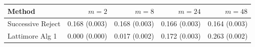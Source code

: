 \begin{tabular}{lrrrr}
\toprule
Method  & $m = 2$ & $m = 8$ & $m = 24$ & $m = 48$ \\
\midrule
Successive Reject & 0.168 (0.003) & 0.168 (0.003) & 0.166 (0.003) & 0.164 (0.003) \\
Lattimore Alg 1 & 0.000 (0.000) & 0.017 (0.002) & 0.172 (0.003) & 0.263 (0.002) \\
\bottomrule
\end{tabular}
